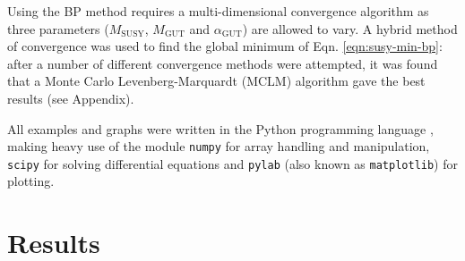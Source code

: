 \documentclass[12pt,a4paper,oneside]{article}
\begin{document}
Using the BP method requires a multi-dimensional convergence algorithm as three parameters ($M_\mathrm{SUSY}$, $M_\mathrm{GUT}$ and $\alpha_\mathrm{GUT}$) are allowed to vary. A hybrid method of convergence was used to find the global minimum of Eqn. \ref{eqn:susy-min-bp}: after a number of different convergence methods were attempted, it was found that a Monte Carlo Levenberg-Marquardt (MCLM) algorithm gave the best results (see Appendix).

All examples and graphs were written in the Python programming language \cite{python}, making heavy use of the module \texttt{numpy} \cite{scipy} for array handling and manipulation, \texttt{scipy} \cite{scipy} for solving differential equations and \texttt{pylab} (also known as \texttt{matplotlib}) \cite{pylab} for plotting.

\section{Results}
\end{document}
